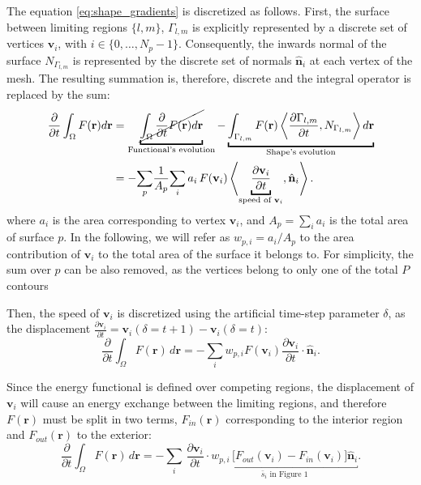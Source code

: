 \documentclass[a4paper]{report}
\renewcommand{\vec}[1]{\mathbf{#1}}
\begin{document}
The equation \eqref{eq:shape_gradients} is discretized as follows.
First, the surface between limiting regions $\{l, m\}$, $\Gamma_{l,m}$ is explicitly represented by
  a discrete set of vertices $\vec{v}_i$, with $i \in \{0, \ldots, N_p -1 \}$.
Consequently, the inwards normal of the surface $N_{\Gamma_{l,m}}$ is represented by the discrete
  set of normals $\hat{\vec{n}}_i$ at each vertex of the mesh.
The resulting summation is, therefore, discrete and the integral operator is replaced by the sum:
  \begin{align}
  \frac{\partial}{\partial t} \int_\Omega F(\vec{r}) d\vec{r} &=
  \underbracket{\cancel{\int_\Omega \frac{\partial}{\partial t}F(\vec{r}) d\vec{r} }}_{\text{Functional's evolution}}
  - \underbracket{\int_{\Gamma_{l,m}} F(\vec{r}) \left\langle \frac{\partial \Gamma_{l,m}}{\partial t},
  N_{\Gamma_{l,m}}\right\rangle d\vec{r}}_{\text{Shape's evolution}} \notag \\
  & = - \underset{p}{\sum} \frac{1}{A_p} \underset{i}{\sum} \, a_i \, F(\vec{v}_i) \left\langle \underbracket{\frac{\partial \vec{v}_i}{\partial t}}_{\text{speed of }\vec{v}_i},
  \hat{\vec{n}}_{i}\right\rangle.
  \label{eq:shape_gradient_orig}
  \end{align}
where $a_i$ is the area corresponding to vertex $\vec{v}_i$, and $A_p = \sum_i a_i$ is the total area of surface $p$.
In the following, we will refer as $w_{p,i} = a_i / A_p $ to the area contribution of $\vec{v}_i$ to the
  total area of the surface it belongs to.
For simplicity, the sum over $p$ can be also removed, as the vertices belong to only one of the total $P$ contours

Then, the speed of $\vec{v}_i$ is discretized using the artificial time-step parameter $\delta$, as the displacement
  $\frac{\partial \vec{v}_i}{\partial t} = \vec{v}_i(\delta = t+1) - \vec{v}_i(\delta = t)$:
  \begin{equation}
  \frac{\partial}{\partial t} \int_\Omega F(\vec{r}) \, d\vec{r} =
  - \underset{i}{\sum} w_{p,i} F(\vec{v}_i) \frac{\partial \vec{v}_i}{\partial t} \cdot \hat{\vec{n}}_i.
  \label{eq:shape_gradient_disc1}
  \end{equation}

Since the energy functional is defined over competing regions, the displacement of $\vec{v}_i$ will cause
  an energy exchange between the limiting regions, and therefore $F(\vec{r})$ must be split in
  two terms, $F_{in}(\vec{r})$ corresponding to the interior region and $F_{out}(\vec{r})$ to the exterior:
  \begin{equation}
  \frac{\partial}{\partial t} \int_\Omega F(\vec{r}) \, d\vec{r} =
  - \underset{i}{\sum} \, \frac{\partial \vec{v}_i}{\partial t} \cdot
  \underbracket{w_{p,i} \, \Big[ F_{out}(\vec{v}_i) - F_{in}(\vec{v}_i) \Big] \hat{\vec{n}}_i}_{\bar{s}_i \text{ in Figure 1}}.
  \label{eq:shape_gradient_disc2}
  \end{equation}
\end{document}
